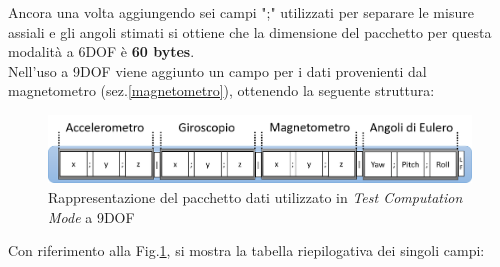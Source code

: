Ancora una volta aggiungendo sei campi ";" utilizzati per separare le misure assiali e gli angoli stimati si ottiene che la dimensione del pacchetto per questa modalità a 6DOF è  \textbf{60 bytes}.\\
Nell'uso a 9DOF viene aggiunto un campo per i dati provenienti dal magnetometro (sez.\ref{magnetometro}), ottenendo la seguente struttura:
\begin{figure}[H]  
	\centering 
	\includegraphics[scale=0.35]{implementazione/tcm9Foto.png}
	\caption{Rappresentazione del pacchetto dati utilizzato in \textit{Test Computation Mode} a 9DOF}
	\label{fig:tcm9Foto}
\end{figure}
Con riferimento alla Fig.\ref{fig:tcm9Foto}, si mostra la tabella riepilogativa dei singoli campi:

